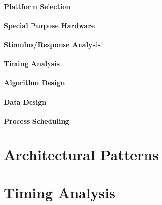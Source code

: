 \documentclass[10pt,a4paper,titlepage,draft]{report} %
\begin{document}
\paragraph{Plattform Selection}

\paragraph{Special Purpose Hardware}

\paragraph{Stimulus/Response Analysis}

\paragraph{Timing Analysis}

\paragraph{Algorithm Design}

\paragraph{Data Design}

\paragraph{Process Scheduling}


\section{Architectural Patterns}

\section{Timing Analysis}

\end{document}

